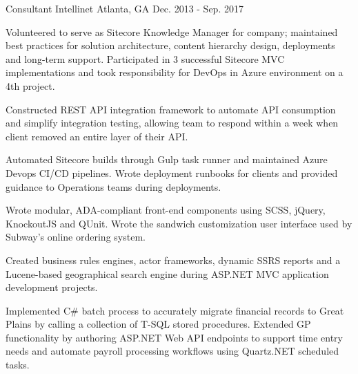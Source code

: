 \begin{cventries}
  \cventry
    {Consultant} %
    {Intellinet} %
    {Atlanta, GA} %
    {Dec. 2013 - Sep. 2017} %
    {
      \begin{cvitems} %
      	\item {Volunteered to serve as Sitecore Knowledge Manager for company; maintained best practices for solution architecture, content hierarchy design, deployments and long-term support. Participated in 3 successful Sitecore MVC implementations and took responsibility for DevOps in Azure environment on a 4th project.}
        \item {Constructed REST API integration framework to automate API consumption and simplify integration testing, allowing team to respond within a week when client removed an entire layer of their API.}
        \item {Automated Sitecore builds through Gulp task runner and maintained Azure Devops CI/CD pipelines. Wrote deployment runbooks for clients and provided guidance to Operations teams during deployments.}
        \item {Wrote modular, ADA-compliant front-end components using SCSS, jQuery, KnockoutJS and QUnit. Wrote the sandwich customization user interface used by Subway's online ordering system.}
        \item {Created business rules engines, actor frameworks, dynamic SSRS reports and a Lucene-based geographical search engine during ASP.NET MVC application development projects.}
        \item {Implemented C\# batch process to accurately migrate financial records to Great Plains by calling a collection of T-SQL stored procedures. Extended GP functionality by authoring ASP.NET Web API endpoints to support time entry needs and automate payroll processing workflows using Quartz.NET scheduled tasks.}
      \end{cvitems}
    }




\end{cventries}
